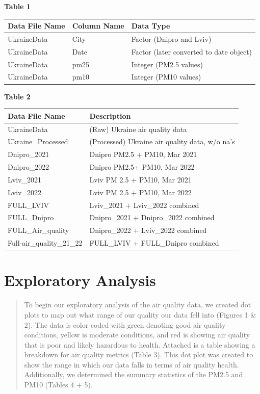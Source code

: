 \documentclass[
  12pt,
]{article}
\begin{document}
\newpage

\textbf{Table 1}

\begin{longtable}[]{@{}lll@{}}
\toprule
Data File Name & Column Name & Data Type \\
\midrule
\endhead
UkraineData & City & Factor (Dnipro and Lviv) \\
UkraineData & Date & Factor (later converted to date object) \\
UkraineData & pm25 & Integer (PM2.5 values) \\
UkraineData & pm10 & Integer (PM10 values) \\
\bottomrule
\end{longtable}

\textbf{Table 2}

\begin{longtable}[]{@{}ll@{}}
\toprule
Data File Name & Description \\
\midrule
\endhead
UkraineData & (Raw) Ukraine air quality data \\
Ukraine\_Processed & (Processed) Ukraine air quality data, w/o na's \\
Dnipro\_2021 & Dnipro PM2.5 + PM10, Mar 2021 \\
Dnipro\_2022 & Dnipro PM2.5+ PM10, Mar 2022 \\
Lviv\_2021 & Lviv PM 2.5 + PM10, Mar 2021 \\
Lviv\_2022 & Lviv PM 2.5 + PM10, Mar 2022 \\
FULL\_LVIV & Lviv\_2021 + Lviv\_2022 combined \\
FULL\_Dnipro & Dnipro\_2021 + Dnipro\_2022 combined \\
FULL\_Air\_quality & Dnipro\_2022 + Lviv\_2022 combined \\
Full-air\_quality\_21\_22 & FULL\_LVIV + FULL\_Dnipro combined \\
\bottomrule
\end{longtable}

\newpage

\hypertarget{exploratory-analysis}{%
\section{Exploratory Analysis}\label{exploratory-analysis}}

\begin{quote}
To begin our exploratory analysis of the air quality data, we created
dot plots to map out what range of our quality our data fell into
(Figures 1 \& 2). The data is color coded with green denoting good air
quality conditions, yellow is moderate conditions, and red is showing
air quality that is poor and likely hazardous to health. Attached is a
table showing a breakdown for air quality metrics (Table 3). This dot
plot was created to show the range in which our data falls in terms of
air quality health. Additionally, we determined the summary statistics
of the PM2.5 and PM10 (Tables 4 + 5).
\end{quote}
\end{document}
